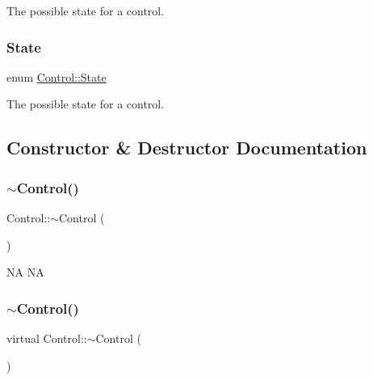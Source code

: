 The possible state for a control. \mbox{\label{classControl_a89e9598cd785841ac91cff3c4798c469}} 
\subsubsection{\texorpdfstring{State}{State}\hspace{0.1cm}{\footnotesize\ttfamily [2/2]}}
{\footnotesize\ttfamily enum \hyperlink{classControl_a89e9598cd785841ac91cff3c4798c469}{Control\+::\+State}\hspace{0.3cm}{\ttfamily [strong]}}

The possible state for a control. 

\subsection{Constructor \& Destructor Documentation}
\mbox{\label{classControl_aedda1328c4f8b8d49bca8f0812d3bfd1}} 
\subsubsection{\texorpdfstring{$\sim$\+Control()}{~Control()}\hspace{0.1cm}{\footnotesize\ttfamily [1/2]}}
{\footnotesize\ttfamily Control\+::$\sim$\+Control (\begin{DoxyParamCaption}{ }\end{DoxyParamCaption})\hspace{0.3cm}{\ttfamily [virtual]}}

NA  NA \mbox{\label{classControl_a51dc2be00da24c37b12ac74ef654e478}} 
\subsubsection{\texorpdfstring{$\sim$\+Control()}{~Control()}\hspace{0.1cm}{\footnotesize\ttfamily [2/2]}}
{\footnotesize\ttfamily virtual Control\+::$\sim$\+Control (\begin{DoxyParamCaption}{ }\end{DoxyParamCaption})\hspace{0.3cm}{\ttfamily [virtual]}}

